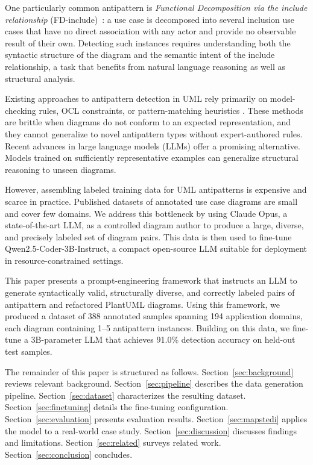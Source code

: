 \documentclass[sigconf,review,anonymous]{acmart}
\begin{document}
One particularly common antipattern is \emph{Functional Decomposition via
the include relationship} (FD-include)~\cite{elattar2006matching,elattar2010improving}: a use case is decomposed into several
inclusion use cases that have no direct association with any actor and
provide no observable result of their own.  Detecting such instances requires
understanding both the syntactic structure of the diagram and the semantic
intent of the include relationship, a task that benefits from natural language
reasoning as well as structural analysis.

Existing approaches to antipattern detection in UML rely primarily on
model-checking rules, OCL constraints, or pattern-matching heuristics
\cite{gogolla2003validation,ballis2008rule,fourati2011metric}.  These methods are brittle when diagrams
do not conform to an expected representation, and they cannot generalize to
novel antipattern types without expert-authored rules.  Recent advances in
large language models (LLMs) offer a promising alternative. Models trained on
sufficiently representative examples can generalize structural reasoning to
unseen diagrams.

However, assembling labeled training data for UML antipatterns is expensive
and scarce in practice.  Published datasets of annotated use case diagrams are small and cover few domains.  We address this bottleneck by using Claude Opus, a state-of-the-art LLM,
as a controlled diagram author to produce a large, diverse, and precisely
labeled set of diagram pairs.  This data is then used to fine-tune
Qwen2.5-Coder-3B-Instruct, a compact open-source LLM suitable for
deployment in resource-constrained settings.

This paper presents a prompt-engineering framework that instructs an LLM to
generate syntactically valid, structurally diverse, and correctly labeled pairs
of antipattern and refactored PlantUML diagrams. Using this framework, we
produced a dataset of 388 annotated samples spanning 194 application domains,
each diagram containing 1--5 antipattern instances.
Building on this data, we fine-tune a 3B-parameter LLM that achieves 91.0\%
detection accuracy on held-out test samples.

The remainder of this paper is structured as follows.
Section~\ref{sec:background} reviews relevant background.
Section~\ref{sec:pipeline} describes the data generation pipeline.
Section~\ref{sec:dataset} characterizes the resulting dataset.
Section~\ref{sec:finetuning} details the fine-tuning configuration.
Section~\ref{sec:evaluation} presents evaluation results.
Section~\ref{sec:mapstedi} applies the model to a real-world case study.
Section~\ref{sec:discussion} discusses findings and limitations.
Section~\ref{sec:related} surveys related work.
Section~\ref{sec:conclusion} concludes.
\end{document}
